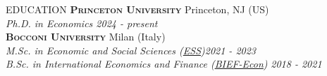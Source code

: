 \documentclass{resume} %
\begin{document}
	\vspace{-0.2cm}
	\begin{rSection}{EDUCATION}
		{\large \textsc{\textbf{Princeton University}}} \hfill {Princeton, NJ (US)}
		\\
		\textit{Ph.D. in Economics \hfill \textit{2024 - present}} \vspace{-0.5cm}\\
		
		{\large \textsc{\textbf{Bocconi University}}} \hfill {Milan (Italy)}
		\\
		\textit{M.Sc. in Economic and Social Sciences (\href{https://www.unibocconi.eu/wps/wcm/connect/bocconi/sitopubblico_en/navigation+tree/home/programs/master+of+science/economic+and+social+sciences/}{\textit{ESS}})}\hfill\textit{2021 - 2023}
		\renewcommand\labelitemi{$\vcenter{\hbox{\tiny$\bullet$}}$}
		\\
		\textit{B.Sc. in International Economics and Finance (\href{https://www.unibocconi.eu/wps/wcm/connect/bocconi/sitopubblico_en/navigation+tree/home/programs/bachelor+of+science/international+economics+and+finance}{\textit{BIEF-Econ}})} \hfill \textit{2018 - 2021}
		\vspace{-0.15cm}
		\renewcommand\labelitemi{$\vcenter{\hbox{\tiny$\bullet$}}$}
		
		
		
		
	\end{rSection}
	
\end{document}
